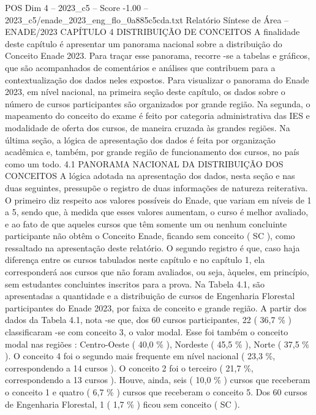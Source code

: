 \begin{textsample}{POS Dim 4 – 2023\_c5 – Score -1.00 – 2023\_c5/enade\_2023\_eng\_flo\_0a885c5cda.txt}  \label{ex:f4_pos_273}
Relatório Síntese de Área – ENADE/2023 CAPÍTULO 4 DISTRIBUIÇÃO DE CONCEITOS A finalidade deste capítulo é apresentar um panorama nacional sobre a distribuição do Conceito Enade 2023.
Para traçar esse panorama, recorre -se a tabelas e gráficos, que são acompanhados de comentários e análises que contribuem para a contextualização dos dados neles expostos.
Para visualizar o panorama do Enade 2023, em nível nacional, na primeira seção deste capítulo, os dados sobre o número de cursos participantes são organizados por grande região.
Na segunda, o mapeamento do conceito do exame é feito por categoria administrativa das IES e modalidade de oferta dos cursos, de maneira cruzada às grandes regiões.
Na última seção, a lógica de apresentação dos dados é feita por organização acadêmica e, também, por grande região de funcionamento dos cursos, no país como um todo. 4.1 PANORAMA NACIONAL DA DISTRIBUIÇÃO DOS CONCEITOS A lógica adotada na apresentação dos dados, nesta seção e nas duas seguintes, pressupõe o registro de duas informações de natureza reiterativa.
O primeiro diz respeito aos valores possíveis do Enade, que variam em níveis de 1 a 5, sendo que, à medida que esses valores aumentam, o curso é melhor avaliado, e ao fato de que aqueles cursos que têm somente um ou nenhum concluinte participante não obtêm o Conceito Enade, ficando sem conceito ( SC ), como ressaltado na apresentação deste relatório.
O segundo registro é que, caso haja diferença entre os cursos tabulados neste capítulo e no capítulo 1, ela corresponderá aos cursos que não foram avaliados, ou seja, àqueles, em princípio, sem estudantes concluintes inscritos para a prova.
Na Tabela 4.1, são apresentadas a quantidade e a distribuição de cursos de Engenharia Florestal participantes do Enade 2023, por faixa de conceito e grande região.
A partir dos dados da Tabela 4.1, nota -se que, dos 60 cursos participantes, 22 ( 36,7 \% ) classificaram -se com conceito 3, o valor modal.
Esse foi também o conceito modal nas regiões : Centro-Oeste ( 40,0 \% ), Nordeste ( 45,5 \% ), Norte ( 37,5 \% ).
O conceito 4 foi o segundo mais frequente em nível nacional ( 23,3 \%, correspondendo a 14 cursos ).
O conceito 2 foi o terceiro ( 21,7 \%, correspondendo a 13 cursos ).
Houve, ainda, seis ( 10,0 \% ) cursos que receberam o conceito 1 e quatro ( 6,7 \% ) cursos que receberam o conceito 5.
Dos 60 cursos de Engenharia Florestal, 1 ( 1,7 \% ) ficou sem conceito ( SC ).

\end{textsample}
